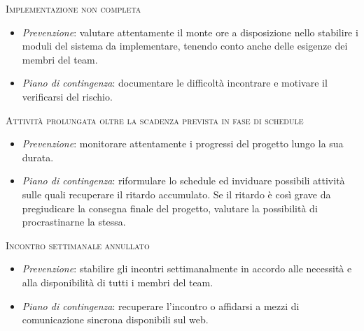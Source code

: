 \textsc{Implementazione non completa}
\begin{itemize}
\item \textit{Prevenzione}: valutare attentamente il monte ore a disposizione nello stabilire i moduli del sistema da implementare, tenendo conto anche delle esigenze dei membri del team.
\item \textit{Piano di contingenza}: documentare le difficoltà incontrare e motivare il verificarsi del rischio.
\end{itemize}
\textsc{Attività prolungata oltre la scadenza prevista in fase di schedule}
\begin{itemize}
\item \textit{Prevenzione}: monitorare attentamente i progressi del progetto lungo la sua durata.
\item \textit{Piano di contingenza}: riformulare lo schedule ed inviduare possibili attività sulle quali recuperare il ritardo accumulato. Se il ritardo è così grave da pregiudicare la consegna finale del progetto, valutare la possibilità di procrastinarne la stessa.
\end{itemize}
\textsc{Incontro settimanale annullato}
\begin{itemize}
\item \textit{Prevenzione}: stabilire gli incontri settimanalmente in accordo alle necessità e alla disponibilità di tutti i membri del team.
\item \textit{Piano di contingenza}: recuperare l'incontro o affidarsi a mezzi di comunicazione sincrona disponibili sul web.
\end{itemize}

